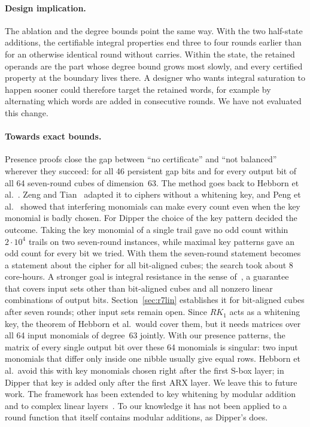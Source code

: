 \documentclass[11pt,a4paper]{article}
\theoremstyle{definition}
\theoremstyle{remark}
\begin{document}
\paragraph{Design implication.} The ablation and the degree bounds point the same way. With the two half-state additions, the certifiable integral properties end three to four rounds earlier than for an otherwise identical round without carries. Within the state, the retained operands are the part whose degree bound grows most slowly, and every certified property at the boundary lives there. A designer who wants integral saturation to happen sooner could therefore target the retained words, for example by alternating which words are added in consecutive rounds. We have not evaluated this change.

\paragraph{Towards exact bounds.} Presence proofs close the gap between ``no certificate'' and ``not balanced'' wherever they succeed: for all 46 persistent gap bits and for every output bit of all 64 seven-round cubes of dimension~63. The method goes back to Hebborn et al.~\cite{hebborn2020,hebborn2021}. Zeng and Tian~\cite{zeng2024} adapted it to ciphers without a whitening key, and Peng et al.~\cite{peng2026} showed that interfering monomials can make every count even when the key monomial is badly chosen. For Dipper the choice of the key pattern decided the outcome. Taking the key monomial of a single trail gave no odd count within $2\cdot10^4$ trails on two seven-round instances, while maximal key patterns gave an odd count for every bit we tried. With them the seven-round statement becomes a statement about the cipher for all bit-aligned cubes; the search took about 8 core-hours. A stronger goal is integral resistance in the sense of~\cite{hebborn2021}, a guarantee that covers input sets other than bit-aligned cubes and all nonzero linear combinations of output bits. Section~\ref{sec:r7lin} establishes it for bit-aligned cubes after seven rounds; other input sets remain open. Since $RK_1$ acts as a whitening key, the theorem of Hebborn et al.\ would cover them, but it needs matrices over all 64 input monomials of degree~63 jointly. With our presence patterns, the matrix of every single output bit over these 64 monomials is singular: two input monomials that differ only inside one nibble usually give equal rows. Hebborn et al.\ avoid this with key monomials chosen right after the first S-box layer; in Dipper that key is added only after the first ARX layer. We leave this to future work. The framework has been extended to key whitening by modular addition~\cite{beierle2025} and to complex linear layers~\cite{gerhalter2026}. To our knowledge it has not been applied to a round function that itself contains modular additions, as Dipper's does.
\end{document}
